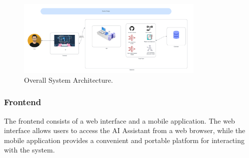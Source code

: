 \begin{figure}[H]
  \centering
  \includegraphics[width=0.8\textwidth]{Figures/System_design_diagram.png}
  \caption{Overall System Architecture.}
  \label{fig:architecture}
\end{figure}


\subsubsection{Frontend}
The frontend consists of a web interface and a mobile application. The web interface allows users to access the AI Assistant from a web browser, while the mobile application provides a convenient and portable platform for interacting with the system.

